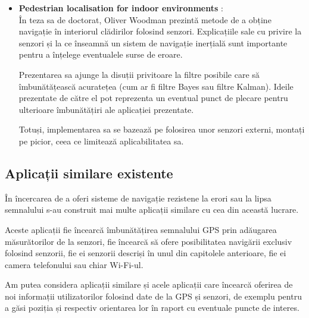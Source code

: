 \documentclass[12pt,a4paper]{article}
\begin{document}
\begin{itemize}
\item \textbf{Pedestrian localisation for indoor environments} \cite{OliverWoodman}:\\
În teza sa de doctorat, Oliver Woodman prezintă metode de a obține navigație în interiorul clădirilor folosind senzori. Explicațiile sale cu privire la senzori și la ce înseamnă un sistem de navigație inerțială sunt importante pentru a înțelege eventualele surse de eroare.

Prezentarea sa ajunge la disuții privitoare la filtre posibile care să îmbunătățească acuratețea (cum ar fi filtre Bayes sau filtre Kalman). Ideile prezentate de către el pot reprezenta un eventual punct de plecare pentru ulterioare îmbunătățiri ale aplicației prezentate.

Totuși, implementarea sa se bazează pe folosirea unor senzori externi, montați pe picior, ceea ce limitează aplicabilitatea sa.

\end{itemize}


\subsection{Aplicații similare existente}
În încercarea de a oferi sisteme de navigație rezistene la erori sau la lipsa semnalului s-au construit mai multe aplicații similare cu cea din această lucrare.

Aceste aplicații fie încearcă îmbunătățirea semnalului GPS prin adăugarea măsurătorilor de la senzori, fie încearcă să ofere posibilitatea navigării exclusiv folosind senzorii, fie ei senzorii descriși în unul din capitolele anterioare, fie ei camera telefonului sau chiar Wi-Fi-ul.

Am putea considera aplicații similare și acele aplicații care încearcă oferirea de noi informații utilizatorilor folosind date de la GPS și senzori, de exemplu pentru a găsi poziția și respectiv orientarea lor în raport cu eventuale puncte de interes.
\end{document}
